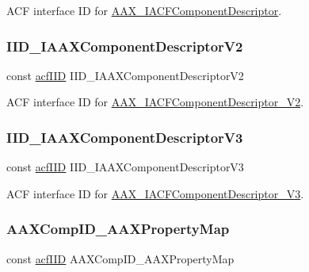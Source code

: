 A\+CF interface ID for \mbox{\hyperlink{a01625}{A\+A\+X\+\_\+\+I\+A\+C\+F\+Component\+Descriptor}}. 

\mbox{\label{a00683_a1d39a90fada901d3d0a384324e79dde5}} 
\subsubsection{\texorpdfstring{IID\_IAAXComponentDescriptorV2}{IID\_IAAXComponentDescriptorV2}}
{\footnotesize\ttfamily const \mbox{\hyperlink{a00269_a59df0b41744eee7a066787aaedf97f67}{acf\+I\+ID}} I\+I\+D\+\_\+\+I\+A\+A\+X\+Component\+Descriptor\+V2}



A\+CF interface ID for \mbox{\hyperlink{a01629}{A\+A\+X\+\_\+\+I\+A\+C\+F\+Component\+Descriptor\+\_\+\+V2}}. 

\mbox{\label{a00683_a4cc4d308ddb1baa7a91f6ac35151987e}} 
\subsubsection{\texorpdfstring{IID\_IAAXComponentDescriptorV3}{IID\_IAAXComponentDescriptorV3}}
{\footnotesize\ttfamily const \mbox{\hyperlink{a00269_a59df0b41744eee7a066787aaedf97f67}{acf\+I\+ID}} I\+I\+D\+\_\+\+I\+A\+A\+X\+Component\+Descriptor\+V3}



A\+CF interface ID for \mbox{\hyperlink{a01633}{A\+A\+X\+\_\+\+I\+A\+C\+F\+Component\+Descriptor\+\_\+\+V3}}. 

\mbox{\label{a00683_a83d2267df335ec2976f28c1739252da0}} 
\subsubsection{\texorpdfstring{AAXCompID\_AAXPropertyMap}{AAXCompID\_AAXPropertyMap}}
{\footnotesize\ttfamily const \mbox{\hyperlink{a00269_a59df0b41744eee7a066787aaedf97f67}{acf\+I\+ID}} A\+A\+X\+Comp\+I\+D\+\_\+\+A\+A\+X\+Property\+Map}



